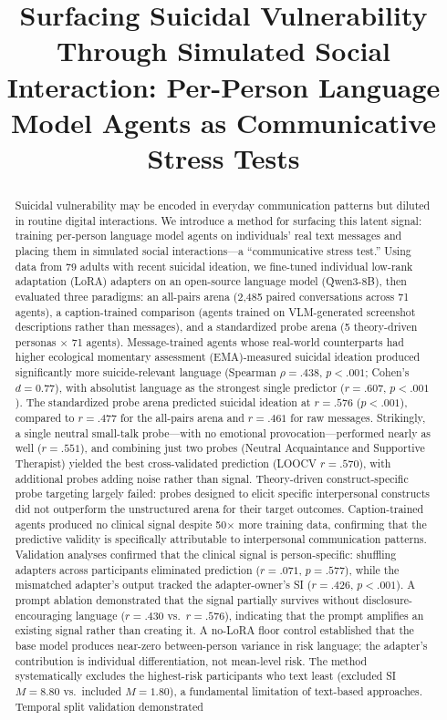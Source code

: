 \documentclass[review,12pt,authoryear]{elsarticle}
\begin{document}
\begin{frontmatter}

\title{Surfacing Suicidal Vulnerability Through Simulated Social Interaction: Per-Person Language Model Agents as Communicative Stress Tests}


\begin{abstract}
Suicidal vulnerability may be encoded in everyday communication patterns but diluted in routine digital interactions. We introduce a method for surfacing this latent signal: training per-person language model agents on individuals' real text messages and placing them in simulated social interactions---a ``communicative stress test.'' Using data from 79 adults with recent suicidal ideation, we fine-tuned individual low-rank adaptation (LoRA) adapters on an open-source language model (Qwen3-8B), then evaluated three paradigms: an all-pairs arena (2,485 paired conversations across 71 agents), a caption-trained comparison (agents trained on VLM-generated screenshot descriptions rather than messages), and a standardized probe arena (5 theory-driven personas $\times$ 71 agents). Message-trained agents whose real-world counterparts had higher ecological momentary assessment (EMA)-measured suicidal ideation produced significantly more suicide-relevant language (Spearman $\rho = .438$, $p < .001$; Cohen's $d = 0.77$), with absolutist language as the strongest single predictor ($r = .607$, $p < .001$). The standardized probe arena predicted suicidal ideation at $r = .576$ ($p < .001$), compared to $r = .477$ for the all-pairs arena and $r = .461$ for raw messages. Strikingly, a single neutral small-talk probe---with no emotional provocation---performed nearly as well ($r = .551$), and combining just two probes (Neutral Acquaintance and Supportive Therapist) yielded the best cross-validated prediction (LOOCV $r = .570$), with additional probes adding noise rather than signal. Theory-driven construct-specific probe targeting largely failed: probes designed to elicit specific interpersonal constructs did not outperform the unstructured arena for their target outcomes. Caption-trained agents produced no clinical signal despite 50$\times$ more training data, confirming that the predictive validity is specifically attributable to interpersonal communication patterns. Validation analyses confirmed that the clinical signal is person-specific: shuffling adapters across participants eliminated prediction ($r = .071$, $p = .577$), while the mismatched adapter's output tracked the adapter-owner's SI ($r = .426$, $p < .001$). A prompt ablation demonstrated that the signal partially survives without disclosure-encouraging language ($r = .430$ vs.\ $r = .576$), indicating that the prompt amplifies an existing signal rather than creating it. A no-LoRA floor control established that the base model produces near-zero between-person variance in risk language; the adapter's contribution is individual differentiation, not mean-level risk. The method systematically excludes the highest-risk participants who text least (excluded SI $M = 8.80$ vs.\ included $M = 1.80$), a fundamental limitation of text-based approaches. Temporal split validation demonstrated 
\end{abstract}
\end{frontmatter}
\end{document}
